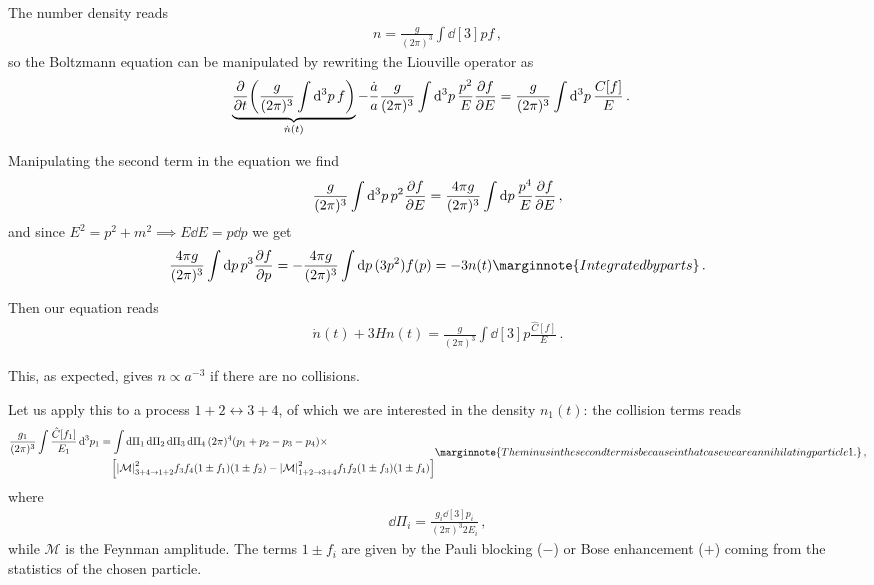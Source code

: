 \documentclass[main.tex]{subfiles}
\begin{document}
The number density reads 
%
\begin{align}
n = \frac{g}{(2 \pi )^3} \int \dd[3]{p} f
\,,
\end{align}
%
so the Boltzmann equation can be manipulated by rewriting the Liouville operator as 
%
\begin{align}
\underbrace{\pdv{}{t} \qty( \frac{g}{(2 \pi )^3} \int \dd[3]{p} f)}_{\dot{n}(t)} - \frac{\dot{a}}{a} \frac{g}{(2 \pi )^3}\int \dd[3]{p} \frac{p^2}{E} \pdv{f}{E} &= 
\frac{g}{(2 \pi )^3} \int \dd[3]{p} \frac{C[f]}{E}
\,.
\end{align}
%

Manipulating the second term in the equation we find
%
\begin{align}
\frac{g}{(2 \pi )^3} \int \dd[3]{p} p^2 \pdv{f}{E} 
= \frac{4 \pi g}{(2 \pi )^3} \int \dd{p} \frac{p^{4}}{E} \pdv{f}{E}
\,,
\end{align}
%
and since \(E^2 = p^2 + m^2 \implies E \dd{E} =p \dd{p}\) we get 
%
\begin{align}
\frac{4 \pi g}{(2 \pi )^3} \int \dd{p} p^3 \pdv{f}{p} 
= -\frac{4 \pi g}{(2 \pi)^3} \int \dd{p} (3 p^2) f(p)
= -3 n(t)
\marginnote{Integrated by parts}
\,.
\end{align}

Then our equation reads 
%
\begin{align}
\dot{n}(t) + 3 H n(t) = \frac{g}{(2 \pi )^3} \int \dd[3]{p} \frac{\hat{C}[f]}{E}
\,.
\end{align}

This, as expected, gives \(n \propto a^{-3}\) if there are no collisions.

Let us apply this to a process \(1 + 2 \leftrightarrow 3 + 4\), of which we are interested in the density \(n_1 (t)\): the collision terms reads 
%
\begin{align}
\begin{split}
\frac{g_1 }{(2 \pi )^3} \int \frac{\hat{C}[f_1 ]}{E_1 } \dd[3]{p_1 } &=
\int \dd{\Pi_1 }\dd{\Pi_2 }\dd{\Pi_3 }\dd{\Pi_4 }
(2 \pi )^{4} (p_1 + p_2 - p_3 - p_4 ) \times \\
&\phantom{=}\ 
\qty[
    \abs{\mathcal{M}}^2_{3 + 4 \to 1 + 2} f_3 f_4 (1 \pm f_1 ) (1 \pm f_2 ) 
    -
    \abs{\mathcal{M}}^2_{1 + 2 \to 3 + 4} f_1 f_2 (1 \pm f_3 ) (1 \pm f_4 ) 
    ]
\end{split}
\marginnote{The minus in the second term is because in that case we are annihilating particle 1.}
\,,
\end{align}
%
where 
%
\begin{align}
\dd{\Pi _i} = \frac{g_i \dd[3]{p_i}}{(2 \pi )^3 2 E_i} 
\,,
\end{align}
%
while \(\mathcal{M}\) is the Feynman amplitude.
The terms \(1 \pm f_i\) are given by the Pauli blocking (\(-\)) or Bose enhancement (\(+\)) coming from the statistics of the chosen particle.
\end{document}
